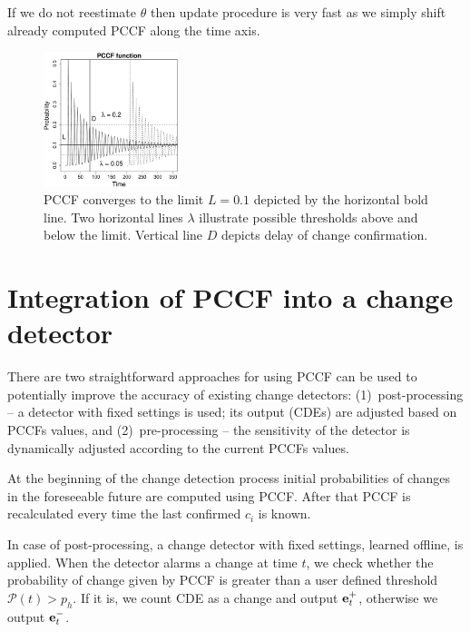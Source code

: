 If we do not reestimate $\theta$ then update procedure is very fast as we simply shift already computed PCCF along the time axis.
\begin{figure}[htb!]
\centering
\includegraphics[width=0.35\textwidth]{articles/pics/sdm_paper/PCCF.pdf}
\caption{PCCF converges to the limit $L = 0.1$ depicted by the horizontal bold line.
Two horizontal lines $\lambda$ illustrate possible thresholds above and below the limit.
Vertical line $D$ depicts delay of change confirmation.
}
\label{fig:conffunction}
\end{figure}

\section{Integration of PCCF into a change detector}
\label{sec:pccf_integration}
There are two straightforward approaches for using PCCF can be used to potentially improve the accuracy of existing change detectors:
(1)~post-processing -- a detector with fixed settings is used; its output (CDEs) are adjusted based on PCCFs values,
and (2)~pre-processing -- the sensitivity of the detector is dynamically adjusted according to the current PCCFs values.

At the beginning of the change detection process initial probabilities of changes in the foreseeable future are computed using PCCF.
After that PCCF is recalculated every time the last confirmed $c_i$ is known.

In case of post-processing, a change detector with fixed settings, learned offline, is applied.
When the detector alarms a change at time $t$, we check whether the probability of change given by PCCF is greater than a user defined threshold $\mathcal{P}(t) > p_h$.
If it is, we count CDE as a change and output $\mathbf{e}_{t}^{+}$, otherwise we output $\mathbf{e}_{t}^{-}$.

